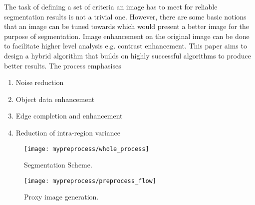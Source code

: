The task of defining a set of criteria an image has to meet for reliable segmentation results is not a trivial one. However, there are some basic notions that an image can be tuned towards which would present a better image for the purpose of segmentation.
Image enhancement on the original image can be done to facilitate higher level analysis e.g. contrast enhancement.
This paper aims to design a hybrid algorithm that builds on highly successful algorithms to produce better results. The process emphasises
\begin{enumerate}
	\item Noise reduction
	\item Object data enhancement
	\item Edge completion and enhancement
	\item Reduction of intra-region variance
\end{enumerate}

\begin{figure}[!h]
	\centering
	\texttt{[image: mypreprocess/whole\_process]}
	\caption{Segmentation Scheme.}
	\label{fig:wholescheme}
\end{figure}

\begin{figure}[!h]
	\centering
	\texttt{[image: mypreprocess/preprocess\_flow]}
	\caption{Proxy image generation.}
	\label{fig:flowchartproposedscheme}
\end{figure}


%


